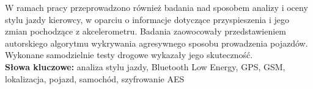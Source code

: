 \begin{singlespacing}
W ramach pracy przeprowadzono również badania nad sposobem analizy i oceny stylu jazdy kierowcy, w oparciu o informacje dotyczące przyspieszenia i jego zmian pochodzące z akcelerometru. Badania zaowocowały przedstawieniem autorskiego algorytmu wykrywania agresywnego sposobu prowadzenia pojazdów. Wykonane samodzielnie testy drogowe wykazały jego skuteczność. \\

\textbf{Słowa kluczowe: }analiza stylu jazdy, Bluetooth Low Energy, GPS, GSM, lokalizacja, pojazd, samochód, szyfrowanie AES

\end{singlespacing}

\cleardoublepage
\thispagestyle{empty}

\\


\\

